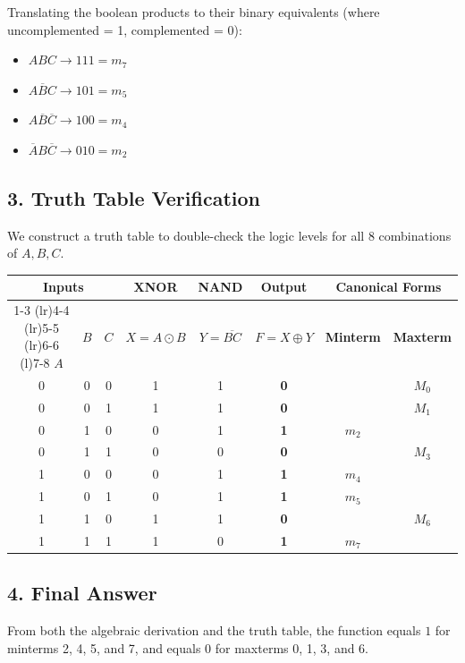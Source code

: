\documentclass[12pt,a3paper]{article}
\begin{document}
\begin{enumerate}
\begin{tcolorbox}[enhanced,breakable,ansbox,colback=cA!4,colframe=cA,boxrule=0.8pt,arc=5pt,title={\textbf{Answer}},fonttitle=\bfseries\color{white},colbacktitle=cA]
Translating the boolean products to their binary equivalents (where uncomplemented = 1, complemented = 0):
\begin{itemize}
    \item $ABC \rightarrow 111 = m_7$
    \item $A\overline{B}C \rightarrow 101 = m_5$
    \item $A\overline{B}\overline{C} \rightarrow 100 = m_4$
    \item $\overline{A}B\overline{C} \rightarrow 010 = m_2$
\end{itemize}

\subsection*{3. Truth Table Verification}
We construct a truth table to double-check the logic levels for all $8$ combinations of $A, B, C$.

\begin{center}
\begin{tabular}{cccccccc}
\toprule
\multicolumn{3}{c}{\textbf{Inputs}} & \textbf{XNOR} & \textbf{NAND} & \textbf{Output} & \multicolumn{2}{c}{\textbf{Canonical Forms}} \\
\cmidrule(r){1-3} \cmidrule(lr){4-4} \cmidrule(lr){5-5} \cmidrule(lr){6-6} \cmidrule(l){7-8}
$A$ & $B$ & $C$ & $X = A \odot B$ & $Y = \overline{BC}$ & $F = X \oplus Y$ & \textbf{Minterm} & \textbf{Maxterm} \\
\midrule
0 & 0 & 0 & 1 & 1 & \textbf{0} & & $M_0$ \\
0 & 0 & 1 & 1 & 1 & \textbf{0} & & $M_1$ \\
0 & 1 & 0 & 0 & 1 & \textbf{1} & $m_2$ & \\
0 & 1 & 1 & 0 & 0 & \textbf{0} & & $M_3$ \\
1 & 0 & 0 & 0 & 1 & \textbf{1} & $m_4$ & \\
1 & 0 & 1 & 0 & 1 & \textbf{1} & $m_5$ & \\
1 & 1 & 0 & 1 & 1 & \textbf{0} & & $M_6$ \\
1 & 1 & 1 & 1 & 0 & \textbf{1} & $m_7$ & \\
\bottomrule
\end{tabular}
\end{center}

\subsection*{4. Final Answer}
From both the algebraic derivation and the truth table, the function equals $1$ for minterms 2, 4, 5, and 7, and equals $0$ for maxterms 0, 1, 3, and 6. 


\end{tcolorbox}
\end{enumerate}
\end{document}
